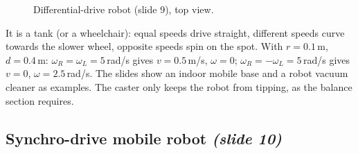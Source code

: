 \documentclass[11pt,a4paper]{article}
\theoremstyle{definition}
\theoremstyle{plain}
\newtheorem{proposition}[definition]{Proposition}
\newcommand{\fixedwheel}[2]{\begin{scope}[shift={(#1)},rotate=#2]
  \draw[fill=gray!30] (-0.3,-0.07) rectangle (0.3,0.07);\end{scope}}
\newcommand{\casterwheel}[2]{\begin{scope}[shift={(#1)},rotate=#2]
  \draw (0,0)--(-0.4,0); \draw[fill=white] (-0.6,-0.06) rectangle (-0.2,0.06);
  \fill (0,0) circle (1.5pt);\end{scope}}
\begin{document}
\begin{figure}[H]
\centering
{}
\caption{Differential-drive robot (slide 9), top view.}
\end{figure}


\begin{intuition}
It is a tank (or a wheelchair): equal speeds drive straight, different speeds curve towards the slower wheel, opposite speeds spin on the spot. With $r=0.1$\,m, $d=0.4$\,m: $\omega_R=\omega_L=5$\,rad/s gives $v=0.5$\,m/s, $\omega=0$; $\omega_R=-\omega_L=5$\,rad/s gives $v=0$, $\omega=2.5$\,rad/s. The slides show an indoor mobile base and a robot vacuum cleaner as examples. The caster only keeps the robot from tipping, as the balance section requires.
\end{intuition}

\subsection{Synchro-drive mobile robot \emph{(slide 10)}}
\end{document}
